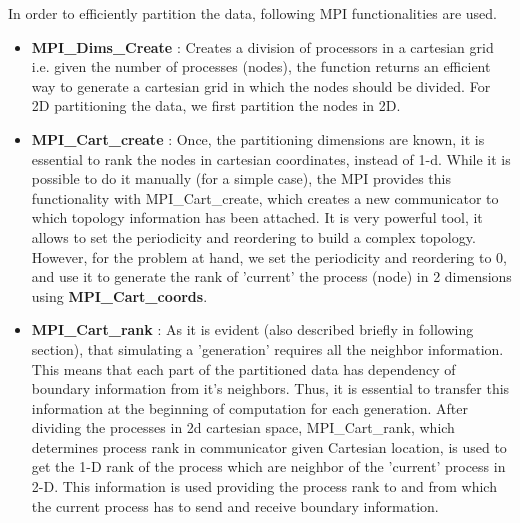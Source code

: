 \documentclass[a4paper, 10pt, conference]{IEEEtran}      %
\begin{document}
	In order to efficiently partition the data, following MPI functionalities are used.
	\begin{itemize}
		\item \textbf{MPI\_Dims\_Create} : Creates a division of processors in a cartesian grid i.e. given the number of processes (nodes), the function returns an efficient way to generate a cartesian grid in which the nodes should be divided. For 2D partitioning the data, we first partition the nodes in 2D.\\
		
		\item \textbf{MPI\_Cart\_create} : Once, the partitioning dimensions are known, it is essential to rank the nodes in cartesian coordinates, instead of 1-d. While it is possible to do it manually (for a simple case), the MPI provides this functionality with MPI\_Cart\_create, which creates a new communicator to which topology information has been attached. It is very powerful tool, it allows to set the periodicity and reordering to build a complex topology. However, for the problem at hand, we set the periodicity and reordering to 0, and use it to generate the rank of 'current' the process (node) in 2 dimensions using \textbf{MPI\_Cart\_coords}.\\
		
		\item \textbf{MPI\_Cart\_rank} : As it is evident (also described briefly in following section), that simulating a 'generation' requires all the neighbor information. This means that each part of the partitioned data has dependency of boundary information from it's neighbors. Thus, it is essential to transfer this information at the beginning of computation for each generation. After dividing the processes in 2d cartesian space, 	MPI\_Cart\_rank, which determines process rank in communicator given Cartesian location, is used to get the 1-D rank of the process which are neighbor of the 'current' process in 2-D. This information is used providing the process rank to and from which the current process has to send and receive boundary information.\\
		

\end{itemize}
\end{document}
